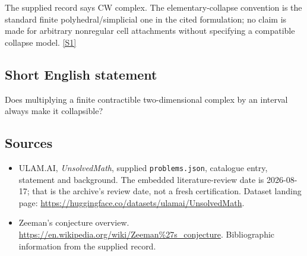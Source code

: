 \documentclass[11pt,a4paper]{article}
\newcommand{\sref}[2]{\hyperlink{source:#1:#2}{[S#2]}}
\begin{document}
The supplied record says CW complex. The elementary-collapse convention is the standard finite polyhedral/simplicial one in the cited formulation; no claim is made for arbitrary nonregular cell attachments without specifying a compatible collapse model. \sref{statement}{1}

\subsection{Short English statement}

Does multiplying a finite contractible two-dimensional complex by an interval always make it collapsible?

\subsection{Sources}

{\small

\begin{itemize}

\item[\hypertarget{source:statement:1}{S1}] ULAM.AI, \emph{UnsolvedMath}, supplied \texttt{problems.json}, catalogue entry, statement and background. The embedded literature-review date is 2026-08-17; that is the archive’s review date, not a fresh certification. Dataset landing page: \url{https://huggingface.co/datasets/ulamai/UnsolvedMath}.

\item[\hypertarget{source:statement:2}{S2}] Zeeman's conjecture overview. \url{https://en.wikipedia.org/wiki/Zeeman%27s_conjecture}. Bibliographic information from the supplied record.

\end{itemize}

}

\label{end:statement}
\end{document}
